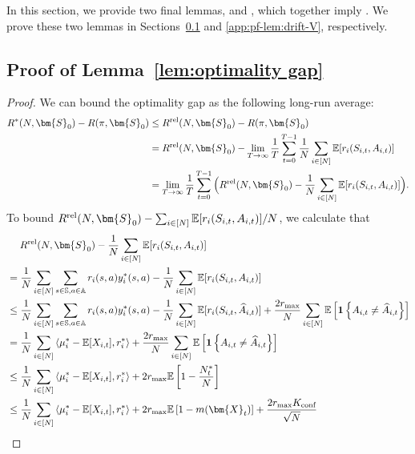\documentclass{article}
\theoremstyle{plain}
\theoremstyle{remark}
\newcommand{\sspa}{\mathbb{S}}
\newcommand{\aspa}{\mathbb{A}}
\newcommand{\sumN}{\sum_{i\in[N]}}
\newcommand{\rel}{\textup{rel}} %
\newcommand{\conf}{\text{conf}}
\def\mX{{\bm{X}}}
\newcommand{\EE}{\mathbb{E}}
\newcommand{\innerproduct}[2]{\left\langle #1, #2 \right\rangle}
\newcommand{\mbracket}[1]{\left[#1\right]}
\newcommand{\sets}[1]{\left\{ #1 \right\}}
\begin{document}
In this section, we provide two final lemmas,  and , which together imply . We prove these two lemmas in Sections~\ref{app:pf-lem-opt-gap} and \ref{app:pf-lem:drift-V}, respectively. 

\subsection{Proof of Lemma~\ref{lem:optimality gap}}
\label{app:pf-lem-opt-gap}

\optgapbyV*

\begin{proof}
    We can bound the optimality gap as the following long-run average: 
    \begin{align}
        \nonumber
        R^*(N,\bm{S}_0) - R(\pi,\bm{S}_0) 
        &\leq R^{\rel}(N,\bm{S}_0)-R(\pi,\bm{S}_0)\\
        \nonumber
        &= R^{\rel}(N,\bm{S}_0) - \lim_{T\to\infty} \frac{1}{T} \sum_{t=0}^{T-1} \frac{1}{N}\sumN \EE[r_i(S_{i,t},A_{i,t})]  \\
        \nonumber
        &= \lim_{T\to\infty} \frac{1}{T} \sum_{t=0}^{T-1} \Big(R^{\rel}(N,\bm{S}_0) - \frac{1}{N}\sumN \EE[r_i(S_{i,t},A_{i,t})]\Big).
    \end{align}
    To bound $R^{\rel}(N,\bm{S}_0) - \sumN \EE[r_i(S_{i,t},A_{i,t})] / N$, we calculate that
    \begin{align}
        \nonumber
        &\mspace{23mu} R^{\rel}(N,\bm{S}_0) - \frac{1}{N}\sumN \EE[r_i(S_{i,t},A_{i,t})]  \\
        \nonumber
        &= \frac{1}{N}\sumN\sum_{s\in\sspa,a\in\aspa}r_i(s,a)y_i^*(s,a) - \frac{1}{N}\sumN \EE[r_i(S_{i,t}, A_{i,t})] \\
        \nonumber
        &\leq \frac{1}{N}\sumN\sum_{s\in\sspa,a\in\aspa}r_i(s,a)y_i^*(s,a) - \frac{1}{N}\sumN \EE[r_i(S_{i,t},\widehat{A}_{i,t})] + \frac{2r_{\max}}{N}\sumN\EE\mbracket{\mathbf{1}\sets{A_{i,t}\neq\widehat{A}_{i,t}}}\\
        \nonumber
        &= \frac{1}{N}\sumN\innerproduct{\mu^*_i-\EE[X_{i,t}]}{r_i^*}  + \frac{2r_{\max}}{N}\sumN\EE\mbracket{\mathbf{1}\sets{A_{i,t}\neq\widehat{A}_{i,t}}} \\
        \label{eq:pf-opt-gap-bd:eq-0}
        &\leq \frac{1}{N}\sumN\innerproduct{\mu^*_i-\EE[X_{i,t}]}{r_i^*} + 2r_{\max} \EE\mbracket{1-\frac{N_{t}^*}{N}}\\
        \label{eq:pf-opt-gap-bd:eq-1}
        &\leq
        \frac{1}{N}\sumN\innerproduct{\mu^*_i-\EE[X_{i,t}]}{r_i^*} + 2r_{\max} \EE\mbracket{1-m(\mX_{t})} + \frac{2r_{\max} K_{\conf}}{\sqrt{N}} \\

\end{align}
\end{proof}
\end{document}
